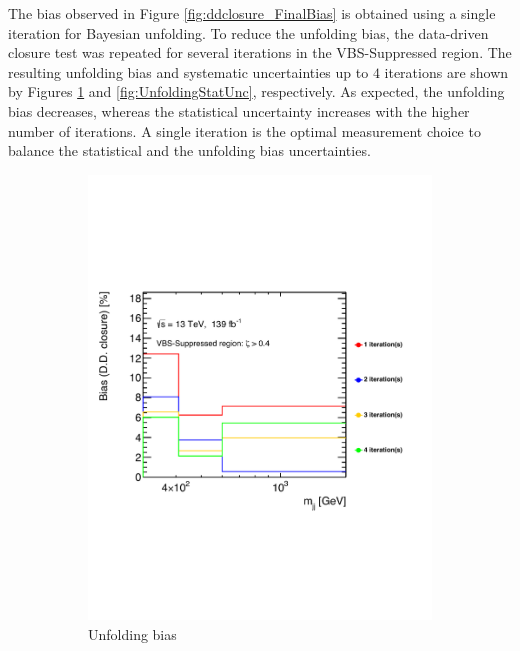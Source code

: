 The bias observed in Figure \ref{fig:ddclosure_FinalBias} is obtained using a single iteration for Bayesian unfolding. To reduce the unfolding bias, the data-driven closure test was repeated for several iterations in the VBS-Suppressed region. The resulting unfolding bias and systematic uncertainties up to $4$ iterations are shown by Figures \ref{fig:UnfoldingBiasIteration} and \ref{fig:UnfoldingStatUnc}, respectively. As expected, the unfolding bias decreases, whereas the statistical uncertainty increases with the higher number of iterations. A single iteration is the optimal measurement choice to balance the statistical and the unfolding bias uncertainties.

\begin{figure}[htb]
    \centering
    \begin{subfigure}{.49\textwidth}
        \centering
        \includegraphics[width=.92\linewidth]{figures/Analysis/Unfolding/UnfoldingBiasIteration_Sup.pdf}
       \caption{ Unfolding bias \label{fig:UnfoldingBiasIteration} }
    \end{subfigure}
    \begin{subfigure}{.49\textwidth}

\end{subfigure}
\end{figure}
